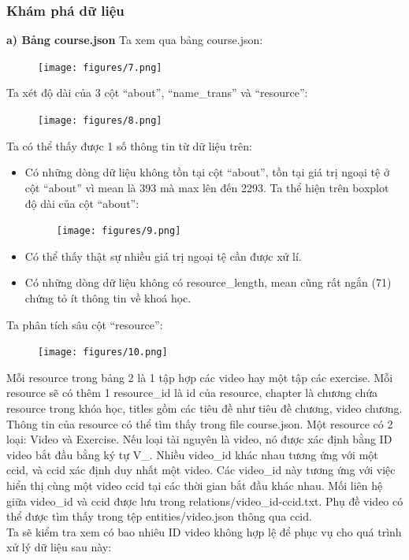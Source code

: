 \subsubsection{Khám phá dữ liệu}
\textbf{a) Bảng course.json}
Ta xem qua bảng course.json:
\begin{figure}[H]
    \centering
    \texttt{[image: figures/7.png]}
\end{figure}
Ta xét độ dài của 3 cột “about”, “name\_trans” và “resource”:
\begin{figure}[H]
    \centering
    \texttt{[image: figures/8.png]}
\end{figure}
\newpage
Ta có thể thấy được 1 số thông tin từ dữ liệu trên:
\begin{itemize}
    \item Có những dòng dữ liệu không tồn tại cột “about”, tồn tại giá trị ngoại tệ ở cột “about” vì mean là 393 mà max lên đến 2293. Ta thể hiện trên boxplot độ dài của cột “about”:
    \begin{figure}[H]
        \centering
        \texttt{[image: figures/9.png]}
    \end{figure}
    \item Có thể thấy thật sự nhiều giá trị ngoại tệ cần được xử lí.
    \item Có những dòng dữ liệu không có resource\_length, mean cũng rất ngắn (71) chứng tỏ ít thông tin về khoá học.
\end{itemize}
Ta phân tích sâu cột “resource”:
\begin{figure}[H]
    \centering
    \texttt{[image: figures/10.png]}
\end{figure}
Mỗi resource trong bảng 2 là 1 tập hợp các video hay một tập các exercise. Mỗi resource sẽ có thêm 1 resource\_id là id của resource, chapter là chương chứa resource trong khóa học, titles gồm các tiêu đề như tiêu đề chương, video chương.\\
Thông tin của resource có thể tìm thấy trong file course.json. Một resource có 2 loại: Video và Exercise. Nếu loại tài nguyên là video, nó được xác định bằng ID video bắt đầu bằng ký tự V\_. Nhiều video\_id khác nhau tương ứng với một ccid, và ccid xác định duy nhất một video. Các video\_id này tương ứng với việc hiển thị cùng một video ccid tại các thời gian bắt đầu khác nhau. Mối liên hệ giữa video\_id và ccid được lưu trong relations/video\_id-ccid.txt. Phụ đề video có thể được tìm thấy trong tệp entities/video.json thông qua ccid.\\
Ta sẽ kiểm tra xem có bao nhiêu ID video không hợp lệ để phục vụ cho quá trình xử lý dữ liệu sau này:
